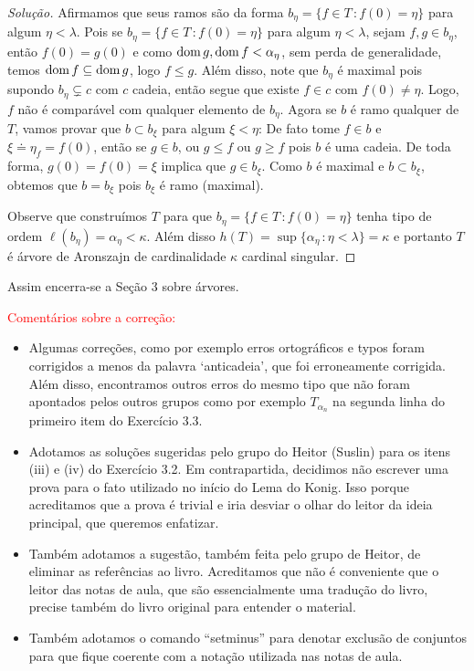 \documentclass[a4paper]{article}
\begin{document}
\begin{proof}[Solução]
 Afirmamos que seus ramos são da forma \(b_\eta=\{f\in T\,\colon f(0)=\eta\}\) para algum
 \(\eta<\lambda\). Pois se \mbox{\(b_\eta=\{f\in T\,\colon f(0)=\eta\}\)} para algum
 \(\eta<\lambda\), sejam \(f,g\in b_\eta\), então \(f(0)=g(0)\) e como
 \(\operatorname{dom} g,\operatorname{dom} f<\alpha_\eta\), sem perda de generalidade,
 temos \(\operatorname{dom} f\subseteq\operatorname{dom} g\), logo \(f\leq g\). Além disso,
 note que \(b_\eta\) é
 maximal pois supondo \(b_\eta\subsetneq c\) com \(c\) cadeia, então segue que existe
 \(f\in c\) com \(f(0)\neq\eta\). Logo, \(f\) não é comparável com qualquer
 elemento de \(b_\eta\). Agora se \(b\) é ramo qualquer de \(T\), vamos provar
 que \(b\subset b_\xi\) para algum \(\xi<\eta\): De fato tome \(f\in b\) e
 \(\xi\doteq \eta_f=f(0)\), então se \(g\in b\), ou \(g\leq f\) ou \(g\geq f\)
 pois  \(b\) é uma cadeia. De toda forma, \(g(0)=f(0)=\xi\) implica que \( g\in
 b_\xi\). Como \(b\) é maximal e \(b\subset b_\xi\), obtemos que \(b=b_\xi\) pois
 \(b_\xi\) é ramo (maximal). 
 
 Observe que construímos \(T\) para que \(b_\eta=\{f\in T\,\colon f(0)=\eta\}\) tenha
 tipo de ordem \(\ell(b_\eta)=\alpha_\eta<\kappa\). Além disso
 \(h(T)=\sup\{\alpha_\eta\,\colon\eta<\lambda\}=\kappa\) e portanto \(T\) é
 árvore de Aronszajn de cardinalidade \(\kappa\) cardinal singular.\qedhere
 
\end{proof}

Assim encerra-se a Seção 3 sobre árvores.
  
  
  \textcolor{red}{Comentários sobre a correção:}
  \begin{itemize}
    \item Algumas correções, como por exemplo erros ortográficos e typos foram
      corrigidos a menos da palavra `anticadeia', que foi erroneamente
      corrigida. Além disso, encontramos outros erros do mesmo tipo que não
      foram apontados pelos outros grupos como por exemplo \(T_{\alpha_n}\) na segunda linha
      do primeiro item do Exercício 3.3.
      \item Adotamos as soluções sugeridas pelo grupo do Heitor (Suslin) para os
        itens (iii) e (iv) do Exercício 3.2. Em contrapartida, decidimos não
        escrever uma prova para o fato utilizado no início do Lema do Konig.
        Isso porque acreditamos que a prova é trivial e iria desviar o olhar do
        leitor da ideia principal, que queremos enfatizar.
      \item Também adotamos a sugestão, também feita pelo grupo de Heitor, de
        eliminar as referências ao livro. Acreditamos que não é conveniente que
        o leitor das notas de aula, que são essencialmente uma tradução do
        livro, precise também do livro original para entender o material.
      \item Também adotamos o comando ``setminus'' para denotar exclusão de
        conjuntos para que fique coerente com a notação utilizada nas notas de aula.
  \end{itemize}
\end{document}
